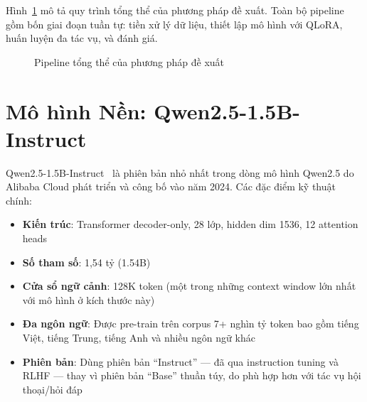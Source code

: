 \documentclass[fontsize=13pt,a4paper,oneside,DIV=calc,chapterprefix=true]{scrbook}
\begin{document}
Hình~\ref{fig:pipeline} mô tả quy trình tổng thể của phương pháp đề xuất. Toàn bộ pipeline
gồm bốn giai đoạn tuần tự: tiền xử lý dữ liệu, thiết lập mô hình với QLoRA, huấn luyện đa
tác vụ, và đánh giá.

\begin{figure}[H]
\centering
{}
\caption{Pipeline tổng thể của phương pháp đề xuất}
\label{fig:pipeline}
\end{figure}

\section{Mô hình Nền: Qwen2.5-1.5B-Instruct}

Qwen2.5-1.5B-Instruct~\cite{qwen25} là phiên bản nhỏ nhất trong dòng mô hình Qwen2.5 do
Alibaba Cloud phát triển và công bố vào năm 2024. Các đặc điểm kỹ thuật chính:

\begin{itemize}
  \item \textbf{Kiến trúc}: Transformer decoder-only, 28 lớp, hidden dim 1536, 12 attention heads
  \item \textbf{Số tham số}: 1,54 tỷ (1.54B)
  \item \textbf{Cửa sổ ngữ cảnh}: 128K token (một trong những context window lớn nhất với mô hình
    ở kích thước này)
  \item \textbf{Đa ngôn ngữ}: Được pre-train trên corpus 7+ nghìn tỷ token bao gồm tiếng Việt,
    tiếng Trung, tiếng Anh và nhiều ngôn ngữ khác
  \item \textbf{Phiên bản}: Dùng phiên bản ``Instruct'' --- đã qua instruction tuning và RLHF
    --- thay vì phiên bản ``Base'' thuần túy, do phù hợp hơn với tác vụ hội thoại/hỏi đáp
\end{itemize}
\end{document}
